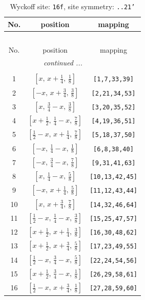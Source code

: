 \documentclass[fleqn,8pt]{jsarticle}
\begin{document}
\renewcommand{\arraystretch}{1.2}
\begin{longtable}{ccc}
\caption{Wyckoff site: {\tt 16f}, site symmetry: {\tt ..21'}}
 \\
 \hline \hline
No. & position & mapping \\ \hline \endfirsthead

\multicolumn{2}{l}{\tablename\ \thetable{}} \\
 \hline \hline
No. & position & mapping \\ \hline \endhead

 \hline \hline
\multicolumn{2}{r}{\footnotesize\it continued ...} \\ \endfoot

 \hline \hline
\multicolumn{2}{r}{} \\ \endlastfoot

1 & $\left[ x,\, x + \frac{1}{4},\, \frac{1}{8} \right]$ & {\tt [1,7,33,39]} \\ \hline
2 & $\left[ - x,\, x + \frac{3}{4},\, \frac{3}{8} \right]$ & {\tt [2,21,34,53]} \\ \hline
3 & $\left[ x,\, \frac{3}{4} - x,\, \frac{3}{8} \right]$ & {\tt [3,20,35,52]} \\ \hline
4 & $\left[ x + \frac{1}{2},\, \frac{1}{4} - x,\, \frac{7}{8} \right]$ & {\tt [4,19,36,51]} \\ \hline
5 & $\left[ \frac{1}{2} - x,\, x + \frac{1}{4},\, \frac{7}{8} \right]$ & {\tt [5,18,37,50]} \\ \hline
6 & $\left[ - x,\, \frac{1}{4} - x,\, \frac{1}{8} \right]$ & {\tt [6,8,38,40]} \\ \hline
7 & $\left[ - x,\, \frac{3}{4} - x,\, \frac{7}{8} \right]$ & {\tt [9,31,41,63]} \\ \hline
8 & $\left[ x,\, \frac{1}{4} - x,\, \frac{5}{8} \right]$ & {\tt [10,13,42,45]} \\ \hline
9 & $\left[ - x,\, x + \frac{1}{4},\, \frac{5}{8} \right]$ & {\tt [11,12,43,44]} \\ \hline
10 & $\left[ x,\, x + \frac{3}{4},\, \frac{7}{8} \right]$ & {\tt [14,32,46,64]} \\ \hline
11 & $\left[ \frac{1}{2} - x,\, \frac{1}{4} - x,\, \frac{3}{8} \right]$ & {\tt [15,25,47,57]} \\ \hline
12 & $\left[ x + \frac{1}{2},\, x + \frac{1}{4},\, \frac{3}{8} \right]$ & {\tt [16,30,48,62]} \\ \hline
13 & $\left[ x + \frac{1}{2},\, x + \frac{3}{4},\, \frac{5}{8} \right]$ & {\tt [17,23,49,55]} \\ \hline
14 & $\left[ \frac{1}{2} - x,\, \frac{3}{4} - x,\, \frac{5}{8} \right]$ & {\tt [22,24,54,56]} \\ \hline
15 & $\left[ x + \frac{1}{2},\, \frac{3}{4} - x,\, \frac{1}{8} \right]$ & {\tt [26,29,58,61]} \\ \hline
16 & $\left[ \frac{1}{2} - x,\, x + \frac{3}{4},\, \frac{1}{8} \right]$ & {\tt [27,28,59,60]} \\
\end{longtable}
\end{document}
